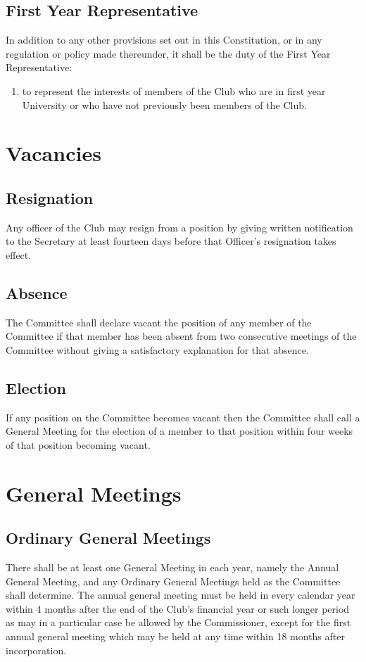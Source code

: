 \documentclass[11pt]{article} %
\begin{document}
\subsection{First Year Representative}
In addition to any other provisions set out in this Constitution, or in any regulation or policy made thereunder, it shall be the duty of the First Year Representative:
\begin{enumerate}
	\item to represent the interests of members of the Club who are in first year University or who have not previously been members of the Club.
\end{enumerate}


\section{Vacancies}
\subsection{Resignation}
Any officer of the Club may resign from a position by giving written notification to the Secretary at least fourteen days before that Officer's resignation takes effect.
\subsection{Absence}
The Committee shall declare vacant the position of any member of the Committee if that member has been absent from two consecutive meetings of the Committee without giving a satisfactory explanation for that absence.
\subsection{Election}
If any position on the Committee becomes vacant then the Committee shall call a General Meeting for the election of a member to that position within four weeks of that position becoming vacant.

\section{General Meetings}
\subsection{Ordinary General Meetings}
There shall be at least one General Meeting in each year, namely the Annual General Meeting, and any Ordinary General Meetings held as the Committee shall determine. The annual general meeting must be held in every calendar year within 4 months after the end of the Club's financial year or such longer period as may in a particular case be allowed by the Commissioner, except for the first annual general meeting which may be held at any time within 18 months after incorporation.
\end{document}
